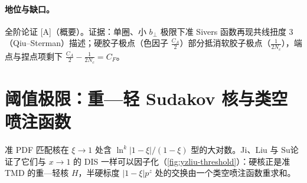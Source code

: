 \paragraph{地位与缺口。}全阶论证 [A]（概要）。证据：单圈、小 $b_\perp$ 极限下准 Sivers 函数再现共线扭度 3（Qiu--Sterman）描述；硬胶子极点（色因子 $\frac{C_A}2$）部分抵消软胶子极点（$\frac1{2N_c}$），端点与捏点项剩下 $\frac{C_A}2-\frac1{2N_c}=C_F$\cite[第~III~节]{Ji:2020jeb}。

\section{阈值极限：重—轻 Sudakov 核与类空喷注函数}\label{sec:yzliu-threshold}

准 PDF 匹配核在 $\xi\to1$ 处含 $\ln^k|1-\xi|/(1-\xi)$ 型的大对数。Ji、Liu 与 Su\cite{Ji:2023pba}论证了它们与 $x\to1$ 的 DIS 一样可以因子化（\cref{fig:yzliu-threshold}）：硬核正是准 TMD 的重—轻核 $H$，半硬标度 $|1-\xi|p^z$ 处的交换由一个类空喷注函数重求和。

